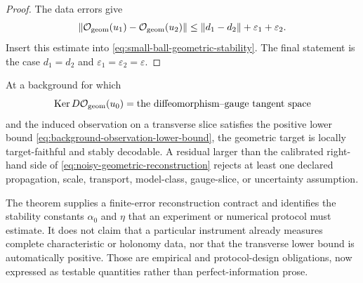 \begin{proof}
The data errors give
\[
\left\lVert\mathcal O_{\mathrm{geom}}(u_1)-\mathcal O_{\mathrm{geom}}(u_2)\right\rVert
\le
\left\lVert d_1-d_2\right\rVert+\varepsilon_1+\varepsilon_2.
\]
Insert this estimate into \eqref{eq:small-ball-geometric-stability}.  The final statement is the case $d_1=d_2$ and $\varepsilon_1=\varepsilon_2=\varepsilon$.
\end{proof}

\begin{corollary}
At a background for which
\[
\operatorname{Ker} D\mathcal O_{\mathrm{geom}}(u_0)
=
\text{the diffeomorphism--gauge tangent space}
\]
and the induced observation on a transverse slice satisfies the positive lower bound \eqref{eq:background-observation-lower-bound}, the geometric target is locally target-faithful and stably decodable.  A residual larger than the calibrated right-hand side of \eqref{eq:noisy-geometric-reconstruction} rejects at least one declared propagation, scale, transport, model-class, gauge-slice, or uncertainty assumption.
\end{corollary}

\begin{remark}
The theorem supplies a finite-error reconstruction contract and identifies the stability constants $\alpha_0$ and $\eta$ that an experiment or numerical protocol must estimate.  It does not claim that a particular instrument already measures complete characteristic or holonomy data, nor that the transverse lower bound is automatically positive.  Those are empirical and protocol-design obligations, now expressed as testable quantities rather than perfect-information prose.
\end{remark}
